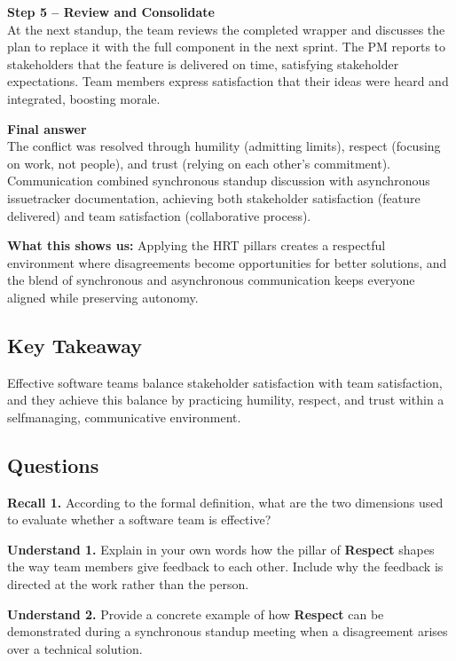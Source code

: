 \documentclass[12pt, a4paper]{article}
\begin{document}
\textbf{Step 5 -- Review and Consolidate}\\
At the next standup, the team reviews the completed wrapper and discusses the plan to replace it with the full component in the next sprint. The PM reports to stakeholders that the feature is delivered on time, satisfying stakeholder expectations. Team members express satisfaction that their ideas were heard and integrated, boosting morale.

\textbf{Final answer}\\
The conflict was resolved through humility (admitting limits), respect (focusing on work, not people), and trust (relying on each other's commitment). Communication combined synchronous standup discussion with asynchronous issuetracker documentation, achieving both stakeholder satisfaction (feature delivered) and team satisfaction (collaborative process).

\textbf{What this shows us:}  
Applying the HRT pillars creates a respectful environment where disagreements become opportunities for better solutions, and the blend of synchronous and asynchronous communication keeps everyone aligned while preserving autonomy.

\subsection{Key Takeaway}
Effective software teams balance stakeholder satisfaction with team satisfaction, and they achieve this balance by practicing humility, respect, and trust within a selfmanaging, communicative environment.

\subsection{Questions}

\noindent \textbf{Recall 1.}  
According to the formal definition, what are the two dimensions used to evaluate whether a software team is effective?

\newpage

\noindent \textbf{Understand 1.}  
Explain in your own words how the pillar of \textbf{Respect} shapes the way team members give feedback to each other. Include why the feedback is directed at the work rather than the person.

\newpage

\noindent \textbf{Understand 2.}  
Provide a concrete example of how \textbf{Respect} can be demonstrated during a synchronous standup meeting when a disagreement arises over a technical solution.
\end{document}
